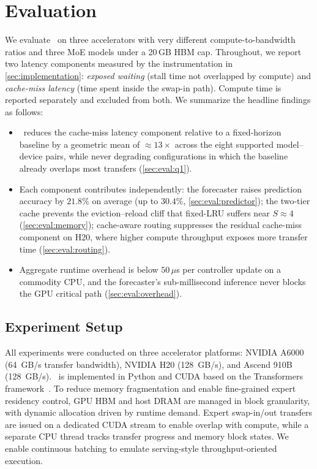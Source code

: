 \section{Evaluation}
\label{sec:evaluation}

We evaluate \systemname\ on three accelerators with very different
compute-to-bandwidth ratios and three MoE models under a 20\,GB HBM
cap. Throughout, we report two latency components measured by the
instrumentation in \autoref{sec:implementation}: \emph{exposed
waiting} (stall time not overlapped by compute) and \emph{cache-miss
latency} (time spent inside the swap-in path). Compute time is
reported separately and excluded from both. We summarize the headline
findings as follows:

\begin{itemize}[leftmargin=1.4em, itemsep=2pt, topsep=2pt]
    \item \systemname\ reduces the cache-miss latency component
    relative to a fixed-horizon baseline by a geometric mean of
    $\approx 13\times$ across the eight supported model--device pairs,
    while never degrading configurations in which the baseline
    already overlaps most transfers (\autoref{sec:eval:q1}).
    \item Each component contributes independently: the forecaster
    raises prediction accuracy by $21.8\%$ on average (up to
    $30.4\%$, \autoref{sec:eval:predictor}); the two-tier cache
    prevents the eviction--reload cliff that fixed-LRU suffers near
    $S\approx 4$ (\autoref{sec:eval:memory}); cache-aware routing
    suppresses the residual cache-miss component on H20, where
    higher compute throughput exposes more transfer time
    (\autoref{sec:eval:routing}).
    \item Aggregate runtime overhead is below $50\,\mu$s per
    controller update on a commodity CPU, and the forecaster's
    sub-millisecond inference never blocks the GPU critical path
    (\autoref{sec:eval:overhead}).
\end{itemize}

\subsection{Experiment Setup}

All experiments were conducted on three accelerator platforms:
NVIDIA A6000~\cite{nvidiaA6000datasheet} (64~GB/s transfer bandwidth),
NVIDIA H20 (128~GB/s), and Ascend 910B (128~GB/s).
\systemname\ is implemented in Python and CUDA based on the Transformers
framework~\cite{wolf2020transformers}.
To reduce memory fragmentation and enable fine-grained expert residency control,
GPU HBM and host DRAM are managed in block granularity, with dynamic allocation
driven by runtime demand.
Expert swap-in/out transfers are issued on a dedicated CUDA stream to enable
overlap with compute, while a separate CPU thread tracks transfer progress and
memory block states.
We enable continuous batching to emulate serving-style throughput-oriented
execution.

